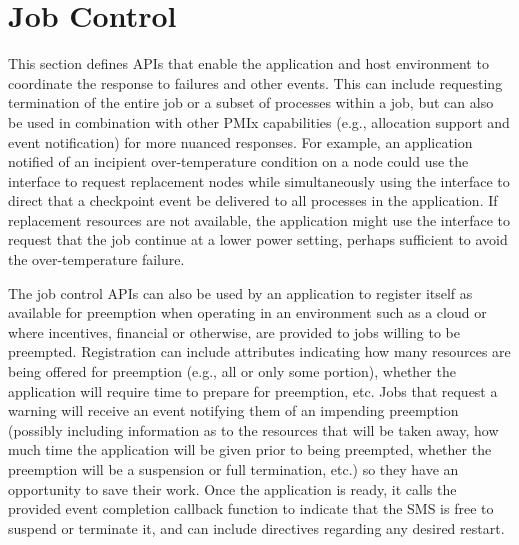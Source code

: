 \section{Job Control}
\label{chap:api_job_mgmt:jctrl}

This section defines \acp{API} that enable the application and host environment to coordinate the response to failures and other events.
This can include requesting termination of the entire job or a subset of processes within a job, but can
also be used in combination with other \ac{PMIx} capabilities (e.g., allocation support and event notification) for more nuanced responses. For example, an application notified of an incipient over-temperature condition on a node could use the  interface to request replacement nodes while simultaneously using the  interface to direct that a checkpoint event be delivered to all processes in the application. If replacement resources are not available, the application might use the  interface to request that the job continue at a lower power setting, perhaps sufficient to avoid the over-temperature failure.

The job control \acp{API} can also be used by an application to register itself as available for preemption when operating in an environment such as a cloud or where incentives, financial or otherwise, are provided to jobs willing to be preempted. Registration can include attributes indicating how many resources are being offered for preemption (e.g., all or only some portion), whether the application will require time to prepare for preemption, etc. Jobs that
request a warning will receive an event notifying them of an impending preemption (possibly including information as to the resources that will be taken away, how much time the application will be given prior to being preempted, whether the preemption will be a suspension or full termination, etc.) so they have an opportunity to save
their work. Once the application is ready, it calls the provided event completion callback function to indicate that
the SMS is free to suspend or terminate it, and can include directives regarding any desired restart.

\subsection{}

